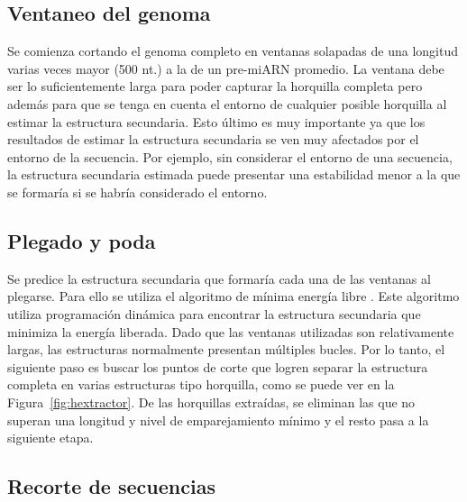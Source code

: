 \subsection{Ventaneo del genoma}

Se comienza cortando el genoma completo en ventanas solapadas de una longitud varias veces mayor (500 nt.) a la de un pre-miARN promedio. La ventana debe ser lo
suficientemente larga para poder capturar la horquilla completa pero además para que se tenga en cuenta el entorno de cualquier posible horquilla al estimar la
estructura secundaria. Esto último es muy importante ya que los resultados de estimar la estructura secundaria se ven muy afectados por el entorno de la
secuencia. Por ejemplo, sin considerar el entorno de una secuencia, la estructura secundaria estimada puede presentar una estabilidad menor a la que se formaría
si se habría considerado el entorno.

\subsection{Plegado y poda}

Se predice la estructura secundaria que formaría cada una de las ventanas al plegarse. Para ello se utiliza el algoritmo de mínima energía libre
\citep{zuker1981optimal}. Este algoritmo utiliza programación dinámica para encontrar la estructura secundaria que minimiza la energía liberada. Dado que las
ventanas utilizadas son relativamente largas, las estructuras normalmente presentan múltiples bucles. Por lo tanto, el siguiente paso es buscar los puntos de
corte que logren separar la estructura completa en varias estructuras tipo horquilla, como se puede ver en la Figura~\ref{fig:hextractor}. De las horquillas
extraídas, se eliminan las que no superan una longitud y nivel de emparejamiento mínimo y el resto pasa a la siguiente etapa.

\subsection{Recorte de secuencias}

